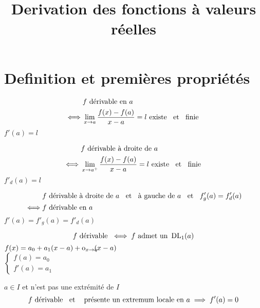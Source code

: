 

\title{Derivation des fonctions à valeurs réelles}


\maketitle
\pagebreak

\section{Definition et premières propriétés}
\quad
\begin{dfn}
\begin{align*}
        &f \drv \e \en a \\
\iff    &\lm_{x \to a} \frac{f(x) - f(a)}{x - a} = l \exs \e \et \e \fn
\end{align*}
$f'(a) = l$
\end{dfn}

\begin{dfn}
\begin{align*}
        &f \drv \e \drt a \\
\iff    &\lm_{x \to a^+} \frac{f(x) - f(a)}{x - a} = l \exs \e \et \e \fn
\end{align*}
$f'_d(a) = l$
\end{dfn}

\begin{prp}
\begin{align*}
        &f \drv \e \drt a \et \e \gch a \et f'_g(a) = f'_d(a) \\
\iff    &f \drv \e \en a
\end{align*}
$f'(a) = f'_g(a) = f'_d(a)$
\end{prp}

\begin{prp}
\[
    f \drv \iff f \text{ admet un } \dl_1(a) \\
\]
$f(x) = a_0 + a_1(x - a) + \ngl{x \to a}{x - a}$ \\
$
\begin{cases}
    f(a) = a_0 \\
    f'(a) = a_1
\end{cases}
$
\end{prp}

\begin{prp}
$a \in I$ et n'est pas une extrémité de $I$ \\
\[
    f \drv \e \et \text{ présente un extremum locale en } a
    \implies f'(a) = 0
\]
\end{prp}

